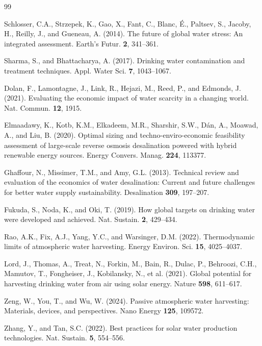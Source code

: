 \documentclass[11pt]{article}
\begin{document}
\begin{thebibliography}{99}

 Schlosser, C.A., Strzepek, K., Gao, X., Fant, C., Blanc, {\'E}., Paltsev, S., Jacoby, H., Reilly, J., and Gueneau, A. (2014). The future of global water stress: An integrated assessment. Earth's Futur. \textbf{2}, 341--361.

 Sharma, S., and Bhattacharya, A. (2017). Drinking water contamination and treatment techniques. Appl. Water Sci. \textbf{7}, 1043--1067.

 Dolan, F., Lamontagne, J., Link, R., Hejazi, M., Reed, P., and Edmonds, J. (2021). Evaluating the economic impact of water scarcity in a changing world. Nat. Commun. \textbf{12}, 1915.

 Elmaadawy, K., Kotb, K.M., Elkadeem, M.R., Sharshir, S.W., D{\'a}n, A., Moawad, A., and Liu, B. (2020). Optimal sizing and techno-enviro-economic feasibility assessment of large-scale reverse osmosis desalination powered with hybrid renewable energy sources. Energy Convers. Manag. \textbf{224}, 113377.

 Ghaffour, N., Missimer, T.M., and Amy, G.L. (2013). Technical review and evaluation of the economics of water desalination: Current and future challenges for better water supply sustainability. Desalination \textbf{309}, 197--207.

 Fukuda, S., Noda, K., and Oki, T. (2019). How global targets on drinking water were developed and achieved. Nat. Sustain. \textbf{2}, 429--434.

 Rao, A.K., Fix, A.J., Yang, Y.C., and Warsinger, D.M. (2022). Thermodynamic limits of atmospheric water harvesting. Energy Environ. Sci. \textbf{15}, 4025--4037.

 Lord, J., Thomas, A., Treat, N., Forkin, M., Bain, R., Dulac, P., Behroozi, C.H., Mamutov, T., Fongheiser, J., Kobilansky, N., et al. (2021). Global potential for harvesting drinking water from air using solar energy. Nature \textbf{598}, 611--617.

 Zeng, W., You, T., and Wu, W. (2024). Passive atmospheric water harvesting: Materials, devices, and perspectives. Nano Energy \textbf{125}, 109572.

 Zhang, Y., and Tan, S.C. (2022). Best practices for solar water production technologies. Nat. Sustain. \textbf{5}, 554--556.


\end{thebibliography}
\end{document}
